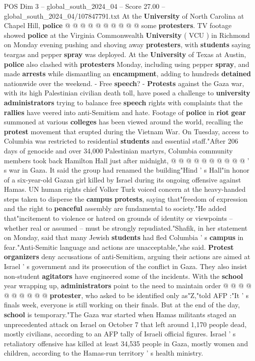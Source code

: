\begin{textsample}{POS Dim 3 – global\_south\_2024\_04 – Score 27.00 – global\_south\_2024\_04/107847791.txt}
At the \textbf{University} of North Carolina at Chapel Hill, \textbf{police} @ @ @ @ @ @ @ @ @ @ some \textbf{protesters}.
TV footage showed \textbf{police} at the Virginia Commonwealth \textbf{University} ( VCU ) in Richmond on Monday evening pushing and shoving away \textbf{protesters}, with \textbf{students} saying teargas and pepper \textbf{spray} was deployed.
At the \textbf{University} of Texas at Austin, \textbf{police} also clashed with \textbf{protesters} Monday, including using pepper \textbf{spray}, and made \textbf{arrests} while dismantling an \textbf{encampment}, adding to hundreds \textbf{detained} nationwide over the weekend. - Free \textbf{speech}? - \textbf{Protests} against the Gaza war, with its high Palestinian civilian death toll, have posed a challenge to \textbf{university} \textbf{administrators} trying to balance free \textbf{speech} rights with complaints that the \textbf{rallies} have veered into anti-Semitism and hate.
Footage of \textbf{police} in \textbf{riot} \textbf{gear} summoned at various \textbf{colleges} has been viewed around the world, recalling the \textbf{protest} movement that erupted during the Vietnam War.
On Tuesday, access to Columbia was restricted to residential \textbf{students} and essential staff."After 206 days of genocide and over 34,000 Palestinian martyrs, Columbia community members took back Hamilton Hall just after midnight, @ @ @ @ @ @ @ @ @ @ ' s war in Gaza.
It said the group had renamed the building"Hind ' s Hall"in honor of a six-year-old Gazan girl killed by Israel during its ongoing offensive against Hamas.
UN human rights chief Volker Turk voiced concern at the heavy-handed steps taken to disperse the \textbf{campus} \textbf{protests}, saying that"freedom of expression and the right to \textbf{peaceful} assembly are fundamental to society."He added that"incitement to violence or hatred on grounds of identity or viewpoints -- whether real or assumed -- must be strongly repudiated."Shafik, in her statement on Monday, said that many Jewish \textbf{students} had fled Columbia ' s \textbf{campus} in fear."Anti-Semitic language and actions are unacceptable,"she said. \textbf{Protest} \textbf{organizers} deny accusations of anti-Semitism, arguing their actions are aimed at Israel ' s government and its prosecution of the conflict in Gaza.
They also insist non-student \textbf{agitators} have engineered some of the incidents.
With the \textbf{school} year wrapping up, \textbf{administrators} point to the need to maintain order @ @ @ @ @ @ @ @ @ @ \textbf{protester}, who asked to be identified only as"Z,"told AFP :"It ' s finals week, everyone is still working on their finals.
But at the end of the day, \textbf{school} is temporary."The Gaza war started when Hamas militants staged an unprecedented attack on Israel on October 7 that left around 1,170 people dead, mostly civilians, according to an AFP tally of Israeli official figures.
Israel ' s retaliatory offensive has killed at least 34,535 people in Gaza, mostly women and children, according to the Hamas-run territory ' s health ministry.


\end{textsample}
